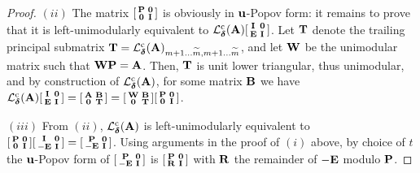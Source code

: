 \documentclass[preprint]{sig-alternate-05-2015}
\begin{document}
\begin{proof}
  $(ii)$
  The matrix
  $[\begin{smallmatrix}
    \popov & \mat{0} \\
    \mat{0} & \idMat[]
  \end{smallmatrix}]$
  is obviously in $\shifts[u]$-Popov form: it remains to prove that it is
  left-unimodularly equivalent to 
  $\colParLin{\minDegs}{\mat{A}}
  [\begin{smallmatrix}
    \idMat[] & \mat{0} \\
    \mat{E} & \idMat[]
  \end{smallmatrix}]$.
  Let $\mat{T}$ denote the trailing principal submatrix $\mat{T} =
  \colParLin{\minDegs}{\mat{A}}_{\rdim+1 \dots \expand{\rdim},\rdim+1 \dots
  \expand{\rdim}}$, and let $\mat{W}$ be the unimodular matrix such that
  $\mat{W} \popov = \mat{A}$. Then, $\mat{T}$ is unit lower triangular, thus
  unimodular, and by construction of $\colParLin{\minDegs}{\mat{A}}$, for some
  matrix $\mat{B}$ we have $\colParLin{\minDegs}{\mat{A}}
  [\begin{smallmatrix}
    \idMat[] & \mat{0} \\
    \mat{E} & \idMat[]
  \end{smallmatrix}]
  =
  [\begin{smallmatrix}
    \mat{A} & \mat{B} \\
    \mat{0} & \mat{T}
  \end{smallmatrix}]
  =
  [\begin{smallmatrix}
    \mat{W} & \mat{B} \\
    \mat{0} & \mat{T}
  \end{smallmatrix}]
  [\begin{smallmatrix}
    \popov & \mat{0} \\
    \mat{0} & \idMat[]
  \end{smallmatrix}]
  $.

  $(iii)$
  From $(ii)$, $\colParLin{\minDegs}{\mat{A}}$ is left-unimodularly equivalent
  to
  $[\begin{smallmatrix}
    \popov & \mat{0} \\
    \mat{0} & \idMat[]
  \end{smallmatrix}]
  [\begin{smallmatrix}
    \idMat[] & \mat{0} \\
    -\mat{E} & \idMat[]
  \end{smallmatrix}]
  =
  [\begin{smallmatrix}
    \popov & \mat{0} \\
    -\mat{E} & \idMat[]
  \end{smallmatrix}]
  $. Using arguments in the proof of $(i)$ above, by choice of $t$ the
  $\shifts[u]$-Popov form of
  $[\begin{smallmatrix}
    \popov & \mat{0} \\
    -\mat{E} & \idMat[]
  \end{smallmatrix}]$
  is 
  $[\begin{smallmatrix}
    \popov & \mat{0} \\
    \mat{R} & \idMat[]
  \end{smallmatrix}]$
  with $\mat{R}$ the remainder of $-\mat{E}$ modulo $\popov$.
\end{proof}
\end{document}
